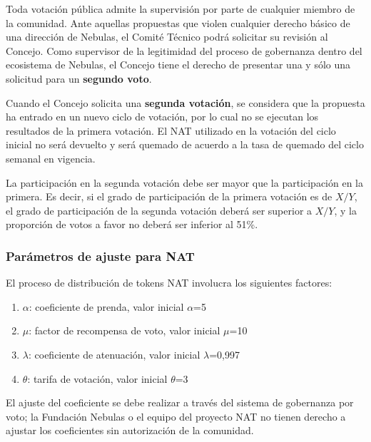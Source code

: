 Toda votación pública admite la supervisión por parte de cualquier miembro de la comunidad. Ante aquellas propuestas que violen cualquier derecho básico de una dirección de Nebulas, el Comité Técnico podrá solicitar su revisión al Concejo. Como supervisor de la legitimidad del proceso de gobernanza dentro del ecosistema de Nebulas, el Concejo tiene el derecho de presentar una y sólo una solicitud para un \textbf{segundo voto}.

Cuando el Concejo solicita una \textbf{segunda votación}, se considera que la propuesta ha entrado en un nuevo ciclo de votación, por lo cual no se ejecutan los resultados de la primera votación. El NAT utilizado en la votación del ciclo inicial no será devuelto y será quemado de acuerdo a la tasa de quemado del ciclo semanal en vigencia.

La participación en la segunda votación debe ser mayor que la participación en la primera. Es decir, si el grado de participación de la primera votación es de $X/Y$, el grado de participación de la segunda votación deberá ser superior a $X/Y$, y la proporción de votos a favor no deberá ser inferior al 51\%.

\subsubsection{Parámetros de ajuste para NAT}

El proceso de distribución de tokens NAT involucra los siguientes factores:

\begin{enumerate}
	\item $\alpha$: coeficiente de prenda, valor inicial $\alpha$=5
	\item $\mu$: factor de recompensa de voto, valor inicial $\mu$=10
	\item $\lambda$: coeficiente de atenuación, valor inicial $\lambda$=0,997
	\item $\theta$: tarifa de votación, valor inicial $\theta$=3
\end{enumerate}

El ajuste del coeficiente se debe realizar a través del sistema de gobernanza por voto; la Fundación Nebulas o el equipo del proyecto NAT no tienen derecho a ajustar los coeficientes sin autorización de la comunidad.